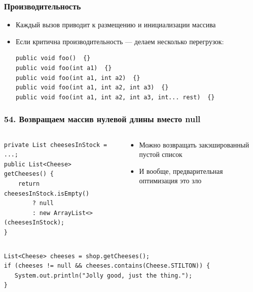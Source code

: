 \documentclass[xetex,mathserif,serif]{beamer}
\begin{document}
	\begin{frame}[fragile]
		\frametitle{Производительность}
		\begin{itemize}
			\item Каждый вызов приводит к размещению и инициализации массива
			\item Если критична производительность --- делаем несколько перегрузок:
				\begin{verbatim}
public void foo()  {}
public void foo(int a1)  {}
public void foo(int a1, int a2)  {}
public void foo(int a1, int a2, int a3)  {}
public void foo(int a1, int a2, int a3, int... rest)  {}
				\end{verbatim}
		\end{itemize}
	\end{frame}

	\begin{frame}[fragile]
		\frametitle{54. Возвращаем массив нулевой длины вместо null}
		\begin{small}
			\begin{columns}
				\begin{column}{0.5\textwidth}
					\begin{verbatim}
private List cheesesInStock = ...;
public List<Cheese> getCheeses() {
    return cheesesInStock.isEmpty() 
        ? null
        : new ArrayList<>(cheesesInStock);
}
					\end{verbatim}
				\end{column}
				\begin{column}{0.5\textwidth}
					\begin{itemize}
						\item Можно возвращать закэшированный пустой список
						\item И вообще, предварительная оптимизация это зло
					\end{itemize}
				\end{column}
			\end{columns}
			\vspace{5mm}
			\begin{verbatim}
List<Cheese> cheeses = shop.getCheeses();
if (cheeses != null && cheeses.contains(Cheese.STILTON)) {
   System.out.println("Jolly good, just the thing.");
}
			\end{verbatim}
		\end{small}
	\end{frame}
\end{document}
